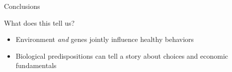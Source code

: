 \documentclass[10pt,compress,xcolor=dvipsnames,aspectratio=169]{beamer}    %
\newcounter{ex}
\newcommand{\1}[1]{\mathrm{1\hspace*{-2.5pt}l}[#1]}	%
\begin{document}

\begin{frame}{Conclusions}%

What does this tell us?

\vspace{4ex}
\begin{itemize}
	\item Environment \emph{and} genes jointly influence healthy behaviors
	\vspace{2ex}
	\item Biological predispositions can tell a story about choices and economic fundamentals
\end{itemize}

\end{frame}

\begin{frame}
\begin{center}
{\Huge \color{Verde}{Thank you}}
\end{center}
\end{frame}



%
%
%
%
\end{document}
